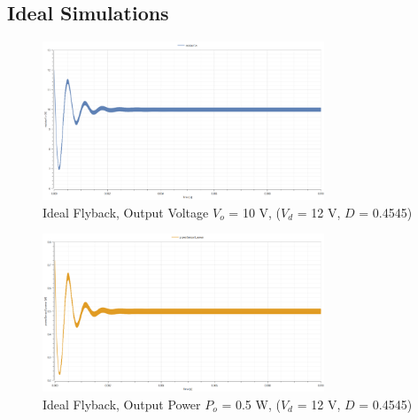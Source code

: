 \documentclass[12pt,twoside]{scrartcl}
\begin{document}
\subsection{Ideal Simulations}
\begin{figure}[htp]
    \centering
    \includegraphics[width=0.75\textwidth]{IdealSim12V.png}
    \caption{Ideal Flyback, Output Voltage $V_o$ = 10 V, ($V_d$ = 12 V, $D$ = 0.4545)}
    \label{fig:IdealSim12V}
\end{figure}

\begin{figure}[htp]
    \centering
    \includegraphics[width=0.75\textwidth]{PowerIdealSim12V.png}
    \caption{Ideal Flyback, Output Power $P_o$ = 0.5 W, ($V_d$ = 12 V, $D$ = 0.4545)}
    \label{fig:PowerIdealSim12V}
\end{figure}
\end{document}
